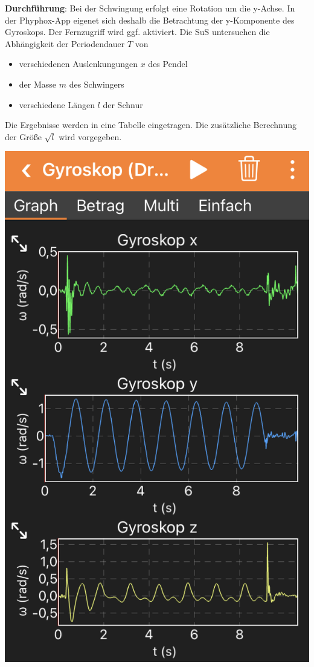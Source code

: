 \documentclass[../main.tex]{subfiles}
\begin{document}
\begin{tcolorbox}
    \vspace{0.5cm}
    \begin{minipage}[]{0.75\textwidth}
        \textbf{Durchführung}: Bei der Schwingung erfolgt eine Rotation um die y-Achse. In der Phyphox-App eigenet sich deshalb die Betrachtung der y-Komponente des Gyroskops. Der Fernzugriff wird ggf. aktiviert. Die SuS untersuchen die Abhängigkeit der Periodendauer $T$ von 
        \begin{itemize}[noitemsep]
            \item verschiedenen Auslenkungungen $x$ des Pendel
            \item der Masse $m$ des Schwingers 
            \item verschiedene Längen $l$ der Schnur
        \end{itemize}
        Die Ergebnisse werden in eine Tabelle eingetragen. Die zusätzliche Berechnung der Größe $\sqrt{l}$ wird vorgegeben.

    \end{minipage}
    \hspace{0.1cm}
    \begin{minipage}[]{0.2\textwidth}
        \includegraphics[width=1.1\textwidth]{img/app}
    \end{minipage}
    

\end{tcolorbox}
\end{document}
